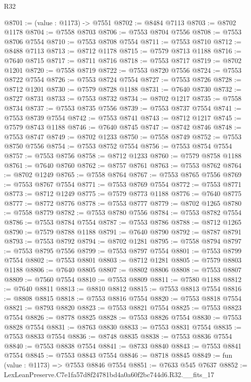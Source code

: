 \begin{lexlean}{R32}
\begin{coremodule}
@8701 := (value : @1173) -> @7551
@8702 := @8484 @7113
@8703 := @8702 @1178
@8704 := @7558 @8703
@8706 := @7553 @8704 @7556
@8708 := @7553 @8706 @7554
@8710 := @7553 @8708 @7554
@8711 := @7553 @8710
@8712 := @8488 @7113
@8713 := @8712 @1178
@8715 := @7579 @8713 @1188
@8716 := @7640 @8715
@8717 := @8711 @8716
@8718 := @7553 @8717
@8719 := @8702 @1201
@8720 := @7558 @8719
@8722 := @7553 @8720 @7556
@8724 := @7553 @8722 @7554
@8726 := @7553 @8724 @7554
@8727 := @7553 @8726
@8728 := @8712 @1201
@8730 := @7579 @8728 @1188
@8731 := @7640 @8730
@8732 := @8727 @8731
@8733 := @7553 @8732
@8734 := @8702 @1217
@8735 := @7558 @8734
@8737 := @7553 @8735 @7556
@8739 := @7553 @8737 @7554
@8741 := @7553 @8739 @7554
@8742 := @7553 @8741
@8743 := @8712 @1217
@8745 := @7579 @8743 @1188
@8746 := @7640 @8745
@8747 := @8742 @8746
@8748 := @7553 @8747
@8749 := @8702 @1233
@8750 := @7558 @8749
@8752 := @7553 @8750 @7556
@8754 := @7553 @8752 @7554
@8756 := @7553 @8754 @7554
@8757 := @7553 @8756
@8758 := @8712 @1233
@8760 := @7579 @8758 @1188
@8761 := @7640 @8760
@8762 := @8757 @8761
@8763 := @7553 @8762
@8764 := @8702 @1249
@8765 := @7558 @8764
@8767 := @7553 @8765 @7556
@8769 := @7553 @8767 @7554
@8771 := @7553 @8769 @7554
@8772 := @7553 @8771
@8773 := @8712 @1249
@8775 := @7579 @8773 @1188
@8776 := @7640 @8775
@8777 := @8772 @8776
@8778 := @7553 @8777
@8779 := @8702 @1265
@8780 := @7558 @8779
@8782 := @7553 @8780 @7556
@8784 := @7553 @8782 @7554
@8786 := @7553 @8784 @7554
@8787 := @7553 @8786
@8788 := @8712 @1265
@8790 := @7579 @8788 @1188
@8791 := @7640 @8790
@8792 := @8787 @8791
@8793 := @7553 @8792
@8794 := @8702 @1281
@8795 := @7558 @8794
@8797 := @7553 @8795 @7556
@8799 := @7553 @8797 @7554
@8801 := @7553 @8799 @7554
@8802 := @7553 @8801
@8803 := @8712 @1281
@8805 := @7579 @8803 @1188
@8806 := @7640 @8805
@8807 := @8802 @8806
@8808 := @7553 @8807
@8809 := @7560 @7554
@8810 := @7553 @8809
@8811 := @7580 @1188
@8812 := @7640 @8811
@8813 := @8810 @8812
@8815 := @7553 @8813 @7554
@8816 := @8808 @8815
@8818 := @7553 @8816 @7554
@8820 := @7553 @8818 @7554
@8821 := @8793 @8820
@8823 := @7553 @8821 @7554
@8825 := @7553 @8823 @7554
@8826 := @8778 @8825
@8828 := @7553 @8826 @7554
@8830 := @7553 @8828 @7554
@8831 := @8763 @8830
@8833 := @7553 @8831 @7554
@8835 := @7553 @8833 @7554
@8836 := @8748 @8835
@8838 := @7553 @8836 @7554
@8840 := @7553 @8838 @7554
@8841 := @8733 @8840
@8843 := @7553 @8841 @7554
@8845 := @7553 @8843 @7554
@8846 := @8718 @8845
@8849 := fun (value : @1173) => @7553 @8846 @7554
@8851 := @7633 @545 @7637
@8852 := LexLeanPreserve.C7e1fa57d8f24781bd4a0a60f2bc744d6.R32.__fits_17

\end{coremodule}
\end{lexlean}
